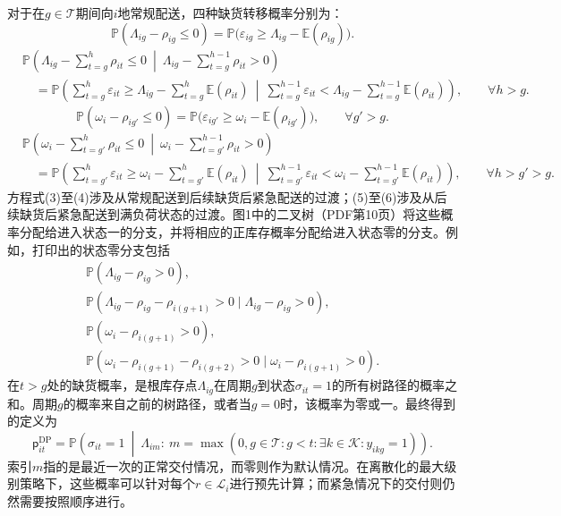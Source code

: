 \documentclass[10pt]{article}
\begin{document}
对于在$g\in\mathcal T$期间向$i$地常规配送，四种缺货转移概率分别为：
\begin{equation}
\mathbb P(\Lambda_{ig}-\rho_{ig}\leqslant0)
=\mathbb P\bigl(\varepsilon_{ig}\geqslant\Lambda_{ig}-\mathbb E(\rho_{ig})\bigr).
\tag{3}
\end{equation}
\begin{equation}
\begin{aligned}
&\mathbb P\left(\Lambda_{ig}-\sum_{t=g}^{h}\rho_{it}\leqslant0\ \middle|\ \Lambda_{ig}-\sum_{t=g}^{h-1}\rho_{it}>0\right)\\
&\quad=\mathbb P\left(\sum_{t=g}^{h}\varepsilon_{it}\geqslant\Lambda_{ig}-\sum_{t=g}^{h}\mathbb E(\rho_{it})\ \middle|\ \sum_{t=g}^{h-1}\varepsilon_{it}<\Lambda_{ig}-\sum_{t=g}^{h-1}\mathbb E(\rho_{it})\right),\qquad\forall h>g.
\end{aligned}\tag{4}
\end{equation}
\begin{equation}
\mathbb P(\omega_i-\rho_{ig'}\leqslant0)
=\mathbb P\bigl(\varepsilon_{ig'}\geqslant\omega_i-\mathbb E(\rho_{ig'})\bigr),\qquad\forall g'>g.
\tag{5}
\end{equation}
\begin{equation}
\begin{aligned}
&\mathbb P\left(\omega_i-\sum_{t=g'}^{h}\rho_{it}\leqslant0\ \middle|\ \omega_i-\sum_{t=g'}^{h-1}\rho_{it}>0\right)\\
&\quad=\mathbb P\left(\sum_{t=g'}^{h}\varepsilon_{it}\geqslant\omega_i-\sum_{t=g'}^{h}\mathbb E(\rho_{it})\ \middle|\ \sum_{t=g'}^{h-1}\varepsilon_{it}<\omega_i-\sum_{t=g'}^{h-1}\mathbb E(\rho_{it})\right),\qquad\forall h>g'>g.
\end{aligned}\tag{6}
\end{equation}
方程式(3)至(4)涉及从常规配送到后续缺货后紧急配送的过渡；(5)至(6)涉及从后续缺货后紧急配送到满负荷状态的过渡。图1中的二叉树（PDF第10页）将这些概率分配给进入状态一的分支，并将相应的正库存概率分配给进入状态零的分支。例如，打印出的状态零分支包括
\begin{gather*}
\mathbb P(\Lambda_{ig}-\rho_{ig}>0),\\
\mathbb P(\Lambda_{ig}-\rho_{ig}-\rho_{i(g+1)}>0\mid\Lambda_{ig}-\rho_{ig}>0),\\
\mathbb P(\omega_i-\rho_{i(g+1)}>0),\\
\mathbb P(\omega_i-\rho_{i(g+1)}-\rho_{i(g+2)}>0\mid\omega_i-\rho_{i(g+1)}>0).
\end{gather*}
在$t>g$处的缺货概率，是根库存点$\Lambda_{ig}$在周期$g$到状态$\sigma_{it}=1$的所有树路径的概率之和。周期$g$的概率来自之前的树路径，或者当$g=0$时，该概率为零或一。最终得到的定义为
\begin{equation}
\mathsf p^{\mathrm{DP}}_{it}
=\mathbb P\left(\sigma_{it}=1\ \middle|\ \Lambda_{im}:\ m=\max(0,g\in\mathcal T:g<t:\exists k\in\mathcal K:y_{ikg}=1)\right).
\tag{7}
\end{equation}
索引$m$指的是最近一次的正常交付情况，而零则作为默认情况。在离散化的最大级别策略下，这些概率可以针对每个$r\in\mathcal L_i$进行预先计算；而紧急情况下的交付则仍然需要按照顺序进行。
\end{document}
